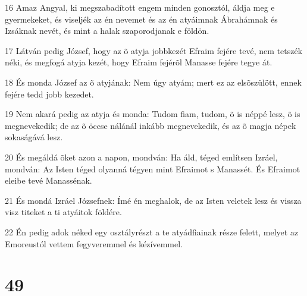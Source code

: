 \par 16 Amaz Angyal, ki megszabadított engem minden gonosztól, áldja meg e gyermekeket, és viseljék az én nevemet és az én atyáimnak Ábrahámnak és Izsáknak nevét, és mint a halak szaporodjanak e földön.
\par 17 Látván pedig József, hogy az õ atyja jobbkezét Efraim fejére tevé, nem tetszék néki, és megfogá atyja kezét, hogy Efraim fejérõl Manasse fejére tegye át.
\par 18 És monda József az õ atyjának: Nem úgy atyám; mert ez az elsõszülött, ennek fejére tedd jobb kezedet.
\par 19 Nem akará pedig az atyja és monda: Tudom fiam, tudom, õ is néppé lesz, õ is megnevekedik; de az õ öccse nálánál inkább megnevekedik, és az õ magja népek sokaságává lesz.
\par 20 És megáldá õket azon a napon, mondván: Ha áld, téged említsen Izráel, mondván: Az Isten téged olyanná tégyen mint Efraimot s Manassét. És Efraimot eleibe tevé Manassénak.
\par 21 És mondá Izráel Józsefnek: Ímé én meghalok, de az Isten veletek lesz és vissza visz titeket a ti atyáitok földére.
\par 22 Én pedig adok néked egy osztályrészt a te atyádfiainak része felett, melyet az Emoreustól vettem fegyveremmel és kézívemmel.

\chapter{49}


